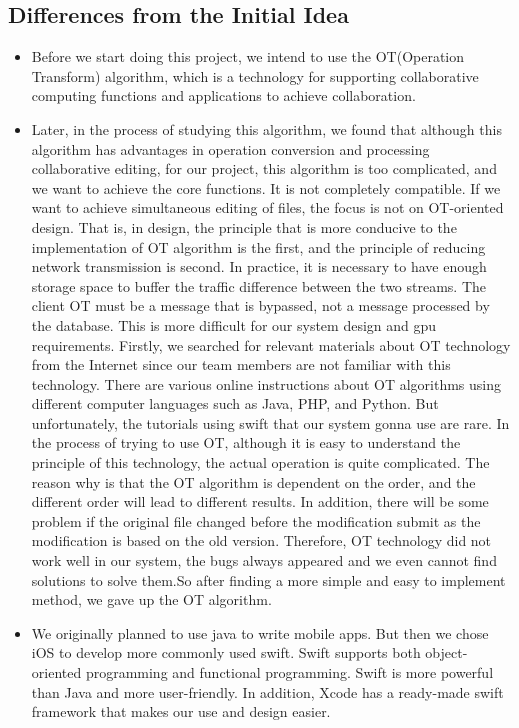 \subsection{Differences from the Initial Idea}
\begin{itemize}
    \item Before we start doing this project, we intend to use the OT(Operation Transform) algorithm, which is a technology for supporting collaborative computing functions and applications to achieve collaboration.
    \item Later, in the process of studying this algorithm, we found that although this algorithm has advantages in operation conversion and processing collaborative editing, for our project, this algorithm is too complicated, and we want to achieve the core functions. It is not completely compatible. If we want to achieve simultaneous editing of files, the focus is not on OT-oriented design. That is, in design, the principle that is more conducive to the implementation of OT algorithm is the first, and the principle of reducing network transmission is second. In practice, it is necessary to have enough storage space to buffer the traffic difference between the two streams. The client OT must be a message that is bypassed, not a message processed by the database. This is more difficult for our system design and gpu requirements. Firstly, we searched for relevant materials about OT technology from the Internet since our team members are not familiar with this technology. There are various online instructions about OT algorithms using different computer languages such as Java, PHP, and Python.  But unfortunately, the tutorials using swift that our system gonna use are rare. In the process of trying to use OT, although it is easy to understand the principle of this technology, the actual operation is quite complicated. The reason why is that the OT algorithm is dependent on the order, and the different order will lead to different results. In addition, there will be some problem if the original file changed before the modification submit as the modification is based on the old version. Therefore, OT technology did not work well in our system, the bugs always appeared and we even cannot find solutions to solve them.So after finding a more simple and easy to implement method, we gave up the OT algorithm.
    
    \item We originally planned to use java to write mobile apps. But then we chose iOS to develop more commonly used swift. Swift supports both object-oriented programming and functional programming. Swift is more powerful than Java and more user-friendly. In addition, Xcode has a ready-made swift framework that makes our use and design easier.
\end{itemize}

